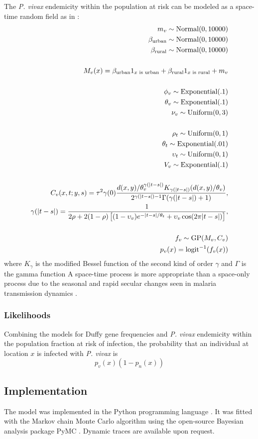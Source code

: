 The \emph{P. vivax} endemicity within the population at risk can be modeled as a space-time random field as in \cite{hay2008}:
\begin{eqnarray*}
    m_v \sim \textup{Normal}(0,10000)\\
    \beta_{\textup{urban}}\sim \textup{Normal}(0,10000)\\
    \beta_{\textup{rural}}\sim \textup{Normal}(0,10000)\\
    \\
    M_v(x) = \beta_{\textup{urban}}1_{x \textup{ is urban}}+\beta_{\textup{rural}}1_{x \textup{ is rural}}+ m_v\\
    \\
    \phi_v\sim\textup{Exponential}(.1)\\
    \theta_v\sim\textup{Exponential}(.1)\\
    \nu_v\sim\textup{Uniform}(0,3)\\
    \\
    \rho_t\sim \textup{Uniform}(0,1) \\
    \theta_t\sim \textup{Exponential}(.01) \\
    \upsilon_t\sim \textup{Uniform}(0,1)\\
    V_v\sim\textup{Exponential}(.1)\\   
    \\ C_v(x,t;y,s)=\tau^2\gamma(0)\frac{d(x,y)/\theta_v^{\gamma(|t-s|)}K_{\gamma(|t-s|)}(d(x,y)/\theta_v)}{2^{\gamma(|t-s|)-1}\Gamma(\gamma(|t-s|)+1)},\\ 
    \gamma(|t-s|) = \frac{1}{2\rho+2(1-\rho)\left[(1-\upsilon_v)e^{-|t-s|/\theta_t}+\upsilon_v\cos(2\pi |t-s|)\right]},\\
    \\
    f_v\sim\textup{GP}(M_v, C_v)\\
    p_v(x)=\textup{logit}^{-1}(f_{v}(x))
\end{eqnarray*} 
where $K_\gamma$ is the modified Bessel function of the second kind of order $\gamma$ and $\Gamma$ is the gamma function \cite{whatever you cited in PLOS paper.}  A space-time process is more appropriate than a space-only process due to the seasonal and rapid secular changes seen in malaria transmission dynamics \cite{blah}. 

\subsubsection*{Likelihoods}
Combining the models for Duffy gene frequencies and \emph{P. vivax} endemicity within the population fraction at risk of infection, the probability that an individual at location $x$ is infected with \emph{P. vivax} is
\begin{equation}
    \label{eq:pv-like}
    p_v(x)(1-p_n(x))
\end{equation}

\subsection*{Implementation} 
The model was implemented in the Python programming language \cite{python}. It was fitted with the Markov chain Monte Carlo algorithm \cite{gilks} using the open-source Bayesian analysis package PyMC \cite{pymc}. Dynamic traces \cite{gilks} are available upon request.